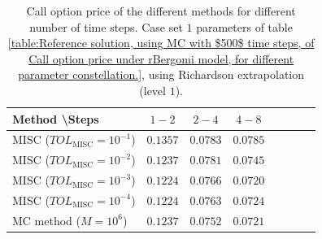\begin{table}[h!]
	\centering
	\begin{tabular}{l*{6}{c}r}
		Method \textbackslash  Steps    &$1-2$         & $2-4$ & $4-8$ \\
		\hline
		MISC ($TOL_{\text{MISC}}=10^{-1}$)  &$0.1357$  &$0.0783$ & $0.0785$   \\
		MISC ($TOL_{\text{MISC}}=10^{-2}$)  & $0.1237$ &$0.0781$ & $0.0745$   \\

		MISC ($TOL_{\text{MISC}}=10^{-3}$)  & $0.1224$ &$0.0766$ & $0.0720$  \\
		MISC ($TOL_{\text{MISC}}=10^{-4}$)  &$0.1224$ & $0.0763$ & $0.0724$ \\
		\hline
		MC method ($M=10^6$)  &$	0.1237$ & $0.0752$ & $0.0721$ \\
		\hline
	\end{tabular}
	\caption{Call option price of the different methods for different number of time steps. Case set $1$ parameters of table \ref{table:Reference solution, using MC with $500$ time steps, of Call option price under rBergomi model, for different parameter constellation.}, using Richardson extrapolation (level $1$).}
	\label{table:  Call option price of the different methods for different number of time steps. Case set $1$ parameter, using Richardson extrapolation (level $1$)}
\end{table}




